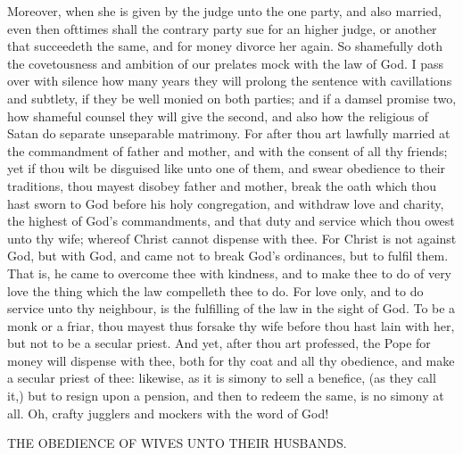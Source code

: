 Moreover, when she is given by the judge unto the 
one party, and also married, even then ofttimes shall the 
contrary party sue for an higher judge, or another that 
succeedeth the same, and for money divorce her again. So 
shamefully doth the covetousness and ambition of our 
prelates mock with the law of God. I pass over with 
silence how many years they will prolong the sentence 
with cavillations and subtlety, if they be well monied on
both parties; and if a damsel promise two, how shameful
counsel they will give the second, and also how the religious
of Satan do separate unseparable matrimony. For
after thou art lawfully married at the commandment of 
father and mother, and with the consent of all thy friends;
yet if thou wilt be disguised like unto one of them, and
swear obedience to their traditions, thou mayest disobey
father and mother, break the oath which thou hast sworn
to God before his holy congregation, and withdraw love
and charity, the highest of God's commandments, and 
that duty and service which thou owest unto thy wife;
whereof Christ cannot dispense with thee. For Christ is 
not against God, but with God, and came not to break 
God's ordinances, but to fulfil them. That is, he came 
to overcome thee with kindness, and to make thee to do of 
very love the thing which the law compelleth thee to do. 
For love only, and to do service unto thy neighbour, is the 
fulfilling of the law in the sight of God. To be a monk 
or a friar, thou mayest thus forsake thy wife before thou 
hast lain with her, but not to be a secular priest. And
yet, after thou art professed, the Pope for money will dispense
with thee, both for thy coat and all thy obedience,
and make a secular priest of thee: likewise, as it is 
simony to sell a benefice, (as they call it,) but to resign 
upon a pension, and then to redeem the same, is no simony 
at all. Oh, crafty jugglers and mockers with the word
of God! 


THE OBEDIENCE OF WIVES UNTO THEIR
HUSBANDS.

